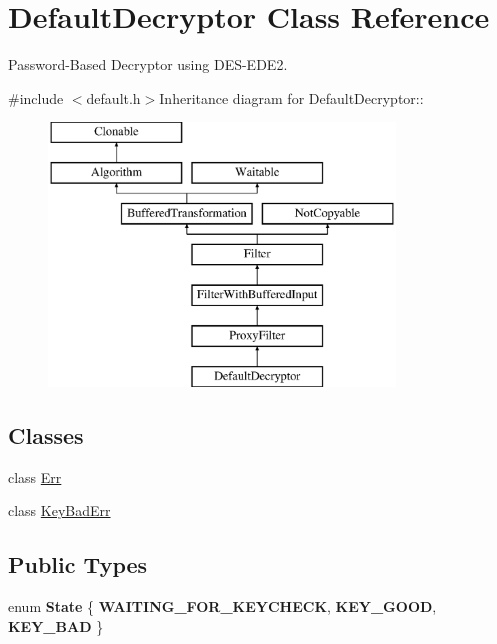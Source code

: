\hypertarget{class_default_decryptor}{
\section{DefaultDecryptor Class Reference}
\label{class_default_decryptor}
}


Password-\/Based Decryptor using DES-\/EDE2.  


{\ttfamily \#include $<$default.h$>$}Inheritance diagram for DefaultDecryptor::\begin{figure}[H]
\begin{center}
\leavevmode
\includegraphics[height=7cm]{class_default_decryptor}
\end{center}
\end{figure}
\subsection*{Classes}
\begin{DoxyCompactItemize}
\item 
class \hyperlink{class_default_decryptor_1_1_err}{Err}
\item 
class \hyperlink{class_default_decryptor_1_1_key_bad_err}{KeyBadErr}
\end{DoxyCompactItemize}
\subsection*{Public Types}
\begin{DoxyCompactItemize}
\item 
enum {\bfseries State} \{ {\bfseries WAITING\_\-FOR\_\-KEYCHECK}, 
{\bfseries KEY\_\-GOOD}, 
{\bfseries KEY\_\-BAD}
 \}
\end{DoxyCompactItemize}
